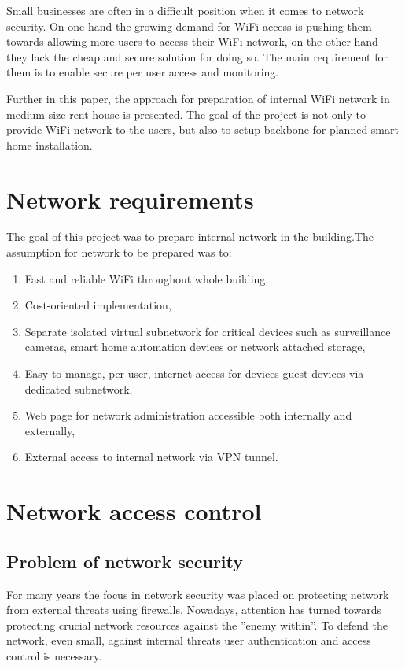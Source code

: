 \documentclass{llncs}
\begin{document}
Small businesses are often in a difficult position when it comes to network
security. On one hand the growing demand for WiFi access is pushing them
towards allowing more users to access their WiFi network, on the other hand they
lack the cheap and secure solution for doing so. The main requirement for them is
to enable secure per user access and monitoring. 

Further in this paper, the approach for preparation of internal WiFi network in
medium size rent house is presented. The goal of the project is not only to
provide WiFi network to the users, but also to setup backbone for planned
smart home installation.

\section{Network requirements}

The goal of this project was to prepare internal network in the building.The
assumption for network to be prepared was to:
\begin{enumerate}
  \item Fast and reliable WiFi throughout whole building,
  \item Cost-oriented implementation,
  \item Separate isolated virtual subnetwork for critical devices
such as surveillance cameras, smart home automation devices or network attached
storage,
  \item Easy to manage, per user, internet access for devices guest devices via
  dedicated subnetwork,
  \item Web page for network administration accessible both internally and
  externally,
  \item External access to internal network via VPN tunnel.
\end{enumerate}


\section{Network access control}

\subsection{Problem of network security}
For many years the focus in network security was placed on protecting
network from external threats using firewalls. Nowadays, attention has turned
towards protecting crucial network resources against the ''enemy within''. To
defend the network, even small, against internal threats user authentication and
access control is necessary. 
\end{document}

